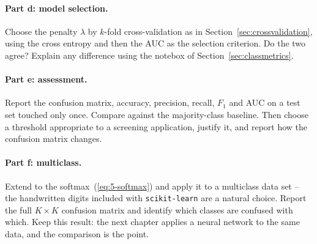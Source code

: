 \paragraph{Part d: model selection.}
Choose the penalty $\lambda$ by $k$-fold cross-validation as in
Section~\ref{sec:crossvalidation}, using the cross entropy and then the AUC as
the selection criterion.  Do the two agree?  Explain any difference using the
notebox of Section~\ref{sec:classmetrics}.

\paragraph{Part e: assessment.}
Report the confusion matrix, accuracy, precision, recall, $F_1$ and AUC on a
test set touched only once.  Compare against the majority-class baseline.
Then choose a threshold appropriate to a screening application, justify it,
and report how the confusion matrix changes.

\paragraph{Part f: multiclass.}
Extend to the softmax~(\ref{eq:5-softmax}) and apply it to a multiclass data
set -- the handwritten digits included with \texttt{scikit-learn} are a
natural choice.  Report the full $K\times K$ confusion matrix and identify
which classes are confused with which.  Keep this result: the next chapter
applies a neural network to the same data, and the comparison is the point.
